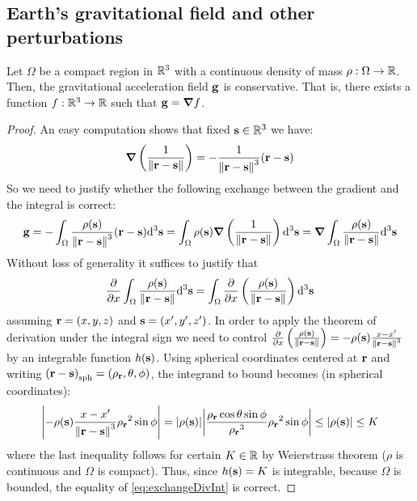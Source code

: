 \documentclass[../main.tex]{subfiles}
\begin{document}
\subsection{Earth's gravitational field and other perturbations}
\begin{theorem}
  Let $\Omega$ be a compact region in $\mathbb{R}^3$ with a continuous density of mass $\rho:\Omega\to\mathbb{R}$. Then, the gravitational acceleration field $\boldsymbol{\mathrm{g}}$ is conservative. That is, there exists a function $f:\mathbb{R}^3\rightarrow\mathbb{R}$ such that $\boldsymbol{\mathrm{g}}=\grad f$.
\end{theorem}
\begin{proof}
  An easy computation shows that fixed $\boldsymbol{\mathrm{s}}\in\mathbb{R}^3$ we have:
  \begin{equation}
    \grad\left(\frac{1}{\left\|\boldsymbol{\mathrm{r}}-\boldsymbol{\mathrm{s}}\right\|}\right)=-\frac{1}{\left\|\boldsymbol{\mathrm{r}}-\boldsymbol{\mathrm{s}}\right\|^3}(\boldsymbol{\mathrm{r}}-\boldsymbol{\mathrm{s}})
  \end{equation}
  So we need to justify whether the following exchange between the gradient and the integral is correct:
  \begin{equation}
    \boldsymbol{\mathrm{g}}=-\int_{\Omega}\frac{\rho(\boldsymbol{\mathrm{s}})}{\left\|\boldsymbol{\mathrm{r}}-\boldsymbol{\mathrm{s}}\right\|^3}(\boldsymbol{\mathrm{r}}-\boldsymbol{\mathrm{s}})\dd^3{\boldsymbol{\mathrm{s}}}=\int_{\Omega}\rho(\boldsymbol{\mathrm{s}})\grad\left(\frac{1}{\left\|\boldsymbol{\mathrm{r}}-\boldsymbol{\mathrm{s}}\right\|}\right)\dd^3{\boldsymbol{\mathrm{s}}}=\grad\int_{\Omega}\frac{\rho(\boldsymbol{\mathrm{s}})}{\left\|\boldsymbol{\mathrm{r}}-\boldsymbol{\mathrm{s}}\right\|}\dd^3{\boldsymbol{\mathrm{s}}}
  \end{equation}
  Without loss of generality it suffices to justify that
  \begin{equation}\label{eq:exchangeDivInt}
    \pdv{}{x}\int_{\Omega}\frac{\rho(\boldsymbol{\mathrm{s}})}{\left\|\boldsymbol{\mathrm{r}}-\boldsymbol{\mathrm{s}}\right\|}\dd^3{\boldsymbol{\mathrm{s}}}=\int_{\Omega}\pdv{}{x}\left(\frac{\rho(\boldsymbol{\mathrm{s}})}{\left\|\boldsymbol{\mathrm{r}}-\boldsymbol{\mathrm{s}}\right\|}\right)\dd^3{\boldsymbol{\mathrm{s}}}
  \end{equation}
  assuming $\boldsymbol{\mathrm{r}}=(x,y,z)$ and $\boldsymbol{\mathrm{s}}=(x',y',z')$. In order to apply the theorem of derivation under the integral sign we need to control $\pdv{}{x}\left(\frac{\rho(\boldsymbol{\mathrm{s}})}{\left\|\boldsymbol{\mathrm{r}}-\boldsymbol{\mathrm{s}}\right\|}\right)=-\rho(\boldsymbol{\mathrm{s}})\frac{x-x'}{\left\|\boldsymbol{\mathrm{r}}-\boldsymbol{\mathrm{s}}\right\|^3}$ by an integrable function $h(\boldsymbol{\mathrm{s}})$. Using spherical coordinates centered at $\boldsymbol{\mathrm{r}}$ and writing ${(\boldsymbol{\mathrm{r}}-\boldsymbol{\mathrm{s}})}_{\mathrm{sph}}=(\rho_{\boldsymbol{\mathrm{r}}},\theta,\phi)$, the integrand to bound becomes (in spherical coordinates):
  \begin{equation}
    \abs{-\rho(\boldsymbol{\mathrm{s}})\frac{x-x'}{\left\|\boldsymbol{\mathrm{r}}-\boldsymbol{\mathrm{s}}\right\|^3}{\rho_{\boldsymbol{\mathrm{r}}}}^2\sin\phi}=\abs{\rho(\boldsymbol{\mathrm{s}})}\abs{\frac{{\rho_{\boldsymbol{\mathrm{r}}}}\cos\theta\sin\phi}{{\rho_{\boldsymbol{\mathrm{r}}}}^3}{\rho_{\boldsymbol{\mathrm{r}}}}^2\sin\phi}\leq \abs{\rho(\boldsymbol{\mathrm{s}})}\leq K
  \end{equation}
  where the last inequality follows for certain $K\in\mathbb{R}$ by Weierstrass theorem ($\rho$ is continuous and $\Omega$ is compact). Thus, since $h(\boldsymbol{\mathrm{s}})=K$ is integrable, because $\Omega$ is bounded, the equality of \cref{eq:exchangeDivInt} is correct.
\end{proof}
\end{document}
